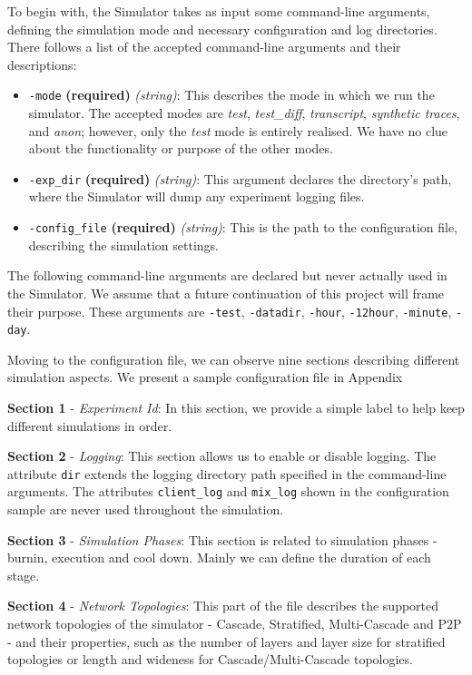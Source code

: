 \documentclass[logo,msc,cyber]{infthesis}   %
\begin{document}
To begin with, the Simulator takes as input some command-line arguments,
defining the simulation mode and necessary configuration and log directories.
There follows a list of the accepted command-line arguments and their
descriptions:

\begin{itemize}
    \item[] \texttt{-mode} \textbf{(required)} \textit{(string)}: This describes
    the mode in which we run the simulator. The accepted modes are \emph{test},
    \emph{test\_diff}, \emph{transcript}, \emph{synthetic traces}, and
    \emph{anon}; however, only the \emph{test} mode is entirely realised. We have no
    clue about the functionality or purpose of the other modes.
    \item[] \texttt{-exp\_dir} \textbf{(required)} \textit{(string)}: This argument
    declares the directory's path, where the Simulator will dump any experiment
    logging files.
    \item[] \texttt{-config\_file} \textbf{(required)} \textit{(string)}: This is
    the path to the configuration file, describing the simulation settings.
 \end{itemize}

The following command-line arguments are declared but never actually used in the
Simulator. We assume that a future continuation of this project will frame their
purpose. These arguments are \texttt{-test}, \texttt{-datadir}, \texttt{-hour},
\texttt{-12hour}, \texttt{-minute}, \texttt{-day}.

Moving to the configuration file, we can observe nine sections describing
different simulation aspects. We present a sample configuration file in Appendix

\textbf{Section 1} - \emph{Experiment Id}: In this section, we provide a simple
label to help keep different simulations in order.
    
\textbf{Section 2} - \emph{Logging}: This section allows us to enable or disable
logging. The attribute \texttt{dir} extends the logging directory path specified
in the command-line arguments. The attributes \texttt{client\_log} and
\texttt{mix\_log} shown in the configuration sample are never used throughout
the simulation.

\textbf{Section 3} - \emph{Simulation Phases}:  This section is related to
simulation phases - burnin, execution and cool down. Mainly we can define the
duration of each stage.

\textbf{Section 4} - \emph{Network Topologies}:  This part of the file describes
the supported network topologies of the simulator - Cascade, Stratified,
Multi-Cascade and P2P - and their properties, such as the number of layers and
layer size for stratified topologies or length and wideness for
Cascade/Multi-Cascade topologies.
\end{document}

